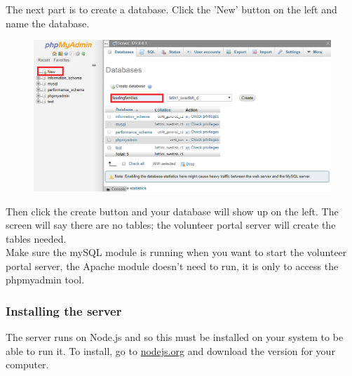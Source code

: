 \documentclass[12pt]{article}
\begin{document}
\noindent
 The next part is to create a database. Click the 'New' button on the left and name the database.
\begin{figure}[H]
    \centering
    \includegraphics[width=1\textwidth]{serversetup/admincreate.png}
\end{figure}
\noindent
Then click the create button and your database will show up on the left. The screen will say there are no tables; the volunteer portal server will create the tables needed.\\

\noindent
Make sure the mySQL module is running when you want to start the volunteer portal server, the Apache module doesn't need to run, it is only to access the phpmyadmin tool.


\subsubsection{Installing the server}
The server runs on Node.js and so this must be installed on your system to be able to run it. To install, go to \href{https://nodejs.org/en/}{nodejs.org} and download the version for your computer.
\end{document}
